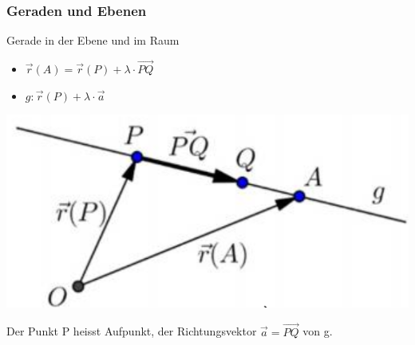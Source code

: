 \raggedcolumns


\subsubsection*{Geraden und Ebenen}

\begin{definition}{Gerade}
    in der Ebene und im Raum\\
    \begin{minipage}{0.65\linewidth}
        \begin{itemize}
            \item $\overrightarrow{r}(A) = \overrightarrow{r}(P) + \lambda \cdot \overrightarrow{PQ}$
            \item $g: \overrightarrow{r}(P) + \lambda \cdot \overrightarrow{a}$
        \end{itemize}
    \end{minipage}
    \begin{minipage}{0.3\linewidth}
        \includegraphics[width=0.9\linewidth]{gerade.png}
    \end{minipage}
    Der Punkt P heisst Aufpunkt, der Richtungsvektor $\overrightarrow{a}  = \overrightarrow{PQ}$ von g.
\end{definition}


